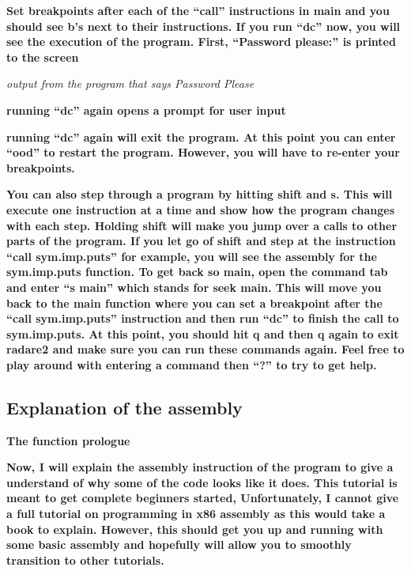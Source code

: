   
 

\textbf{Set breakpoints after each of the ``call'' instructions in main and you should see b's next to their
instructions. If you run ``dc'' now, you will see the execution of the program. First, ``Password please:'' is printed
to the screen}

  
 

\textit{output from the program that says Password Please}

\textbf{running ``dc'' again opens a prompt for user input}

  
 

\textbf{running ``dc'' again will exit the program. At this point you can enter ``ood'' to restart the program. However,
you will have to re-enter your breakpoints.}

\textbf{You can also step through a program by hitting shift and s. This will execute one instruction at a time and show
how the program changes with each step. Holding shift will make you jump over a calls to other parts of the program. If
you let go of shift and step at the instruction ``call sym.imp.puts'' for example, you will see the assembly for the
sym.imp.puts function. To get back so main, open the command tab and enter ``s main'' which stands for seek main. This
will move you back to the main function where you can set a breakpoint after the ``call sym.imp.puts'' instruction and
then run ``dc'' to finish the call to sym.imp.puts. At this point, you should hit q and then q again to exit radare2
and make sure you can run these commands again. Feel free to play around with entering a command then ``?'' to try to
get help.}

\subsection{Explanation of the assembly}

\textbf{The function prologue}

\textbf{Now, I will explain the assembly instruction of the program to give a understand of why some of the code looks
like it does. This tutorial is meant to get complete beginners started, Unfortunately, I cannot give a full tutorial on
programming in x86 assembly as this would take a book to explain. However, this should get you up and running with some
basic assembly and hopefully will allow you to smoothly transition to other tutorials.}


